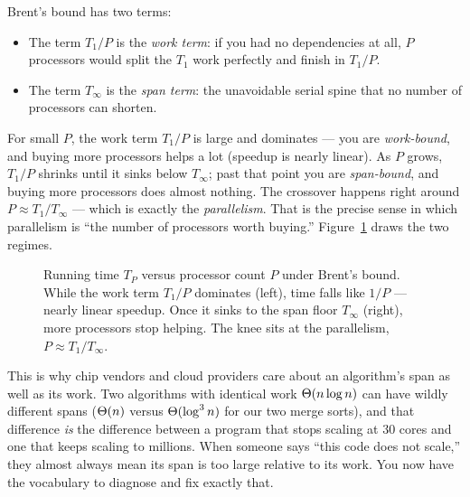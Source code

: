 \begin{intuitionbox}
Brent's bound has two terms:
\begin{itemize}
\item The term $T_1/P$ is the \emph{work term}: if you had no dependencies at all,
$P$ processors would split the $T_1$ work perfectly and finish in $T_1/P$.
\item The term $T_\infty$ is the \emph{span term}: the unavoidable serial spine
that no number of processors can shorten.
\end{itemize}
For small $P$, the work term $T_1/P$ is large and dominates --- you are
\emph{work-bound}, and buying more processors helps a lot (speedup is nearly
linear). As $P$ grows, $T_1/P$ shrinks until it sinks below $T_\infty$; past that
point you are \emph{span-bound}, and buying more processors does almost nothing.
The crossover happens right around $P \approx T_1/T_\infty$ --- which is exactly
the \emph{parallelism}. That is the precise sense in which parallelism is ``the
number of processors worth buying.'' Figure~\ref{ch35:brent-curve} draws the two
regimes.
\end{intuitionbox}

\begin{figure}[h]
\centering
{}
\caption{Running time $T_P$ versus processor count $P$ under Brent's bound. While
the work term $T_1/P$ dominates (left), time falls like $1/P$ --- nearly linear
speedup. Once it sinks to the span floor $T_\infty$ (right), more processors stop
helping. The knee sits at the parallelism, $P \approx T_1/T_\infty$.}
\label{ch35:brent-curve}
\end{figure}

\begin{aestheticbox}
This is why chip vendors and cloud providers care about an
algorithm's span as well as its work. Two algorithms with identical work
$\Theta(n\log n)$ can have wildly different spans ($\Theta(n)$ versus $\Theta(\log^3 n)$ for
our two merge sorts), and that difference \emph{is} the difference between a
program that stops scaling at $30$ cores and one that keeps scaling to millions.
When someone says ``this code does not scale,'' they almost always mean its span
is too large relative to its work. You now have the vocabulary to diagnose and fix
exactly that.
\end{aestheticbox}


